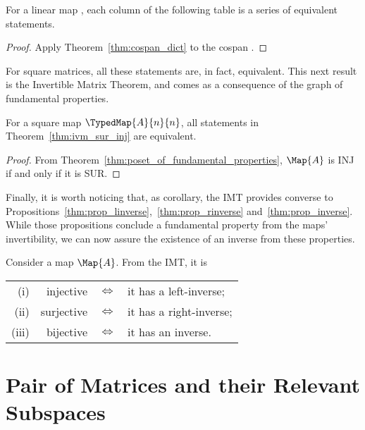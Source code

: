 \documentclass[manyauthors]{fundam}
\begin{document}
\begin{theorem}
\label{thm:ivm_sur_inj}
For a linear map ,
each column of the following table is a series of equivalent statements.
\begin{center}
\end{center}
\end{theorem}
\begin{proof}
  Apply Theorem~\ref{thm:cospan_dict} to the cospan .
\end{proof}

For square matrices, all these statements are, in fact, equivalent.
This next result is the Invertible Matrix Theorem,
and comes as a consequence of the graph of fundamental properties.

\begin{theorem}
\label{thm:ivm_inv}
For a square map $\TypedMap{A}{n}{n}$,
all statements in Theorem~\ref{thm:ivm_sur_inj} are equivalent.
\end{theorem}
\begin{proof}
  From Theorem~\ref{thm:poset_of_fundamental_properties}, $\Map{A}$ is INJ if and only if it is SUR.
\end{proof}

Finally, it is worth noticing that, as corollary,
the IMT provides converse to Propositions~\ref{thm:prop_linverse},~\ref{thm:prop_rinverse} and~\ref{thm:prop_inverse}.
While those propositions conclude a fundamental property from the maps' invertibility,
we can now assure the existence of an inverse from these properties.

\begin{corollary}
  Consider a map $\Map{A}$. From the IMT, it is\newline
    \begin{tabular}{rrcl}
      (i)   & injective  &$\iff$ &it has a left-inverse; \\
      (ii)  & surjective &$\iff$ &it has a right-inverse; \\
      (iii) & bijective  &$\iff$ &it has an inverse.
    \end{tabular}
\end{corollary}

\section{Pair of Matrices and their Relevant Subspaces}
\end{document}
